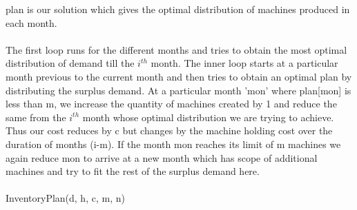 \documentclass[10pt]{article}
\begin{document}
plan is our solution which gives the optimal distribution of machines produced in each month.\\\\
The first loop runs for the different months and tries to obtain the most optimal distribution of demand till the $i^{th}$ month. The inner loop starts at a particular month previous to the current month and then tries to obtain an optimal plan by distributing the surplus demand. At a particular month 'mon' where plan[mon] is less than m, we increase the quantity of machines created by 1 and reduce the same from the $i^{th}$ month whose optimal distribution we are trying to achieve. Thus our cost reduces by c but changes by the machine holding cost over the duration of months (i-m). If the month mon reaches its limit of m machines we again reduce mon to arrive at a new month which has scope of additional machines and try to fit the rest of the surplus demand here.\\\\
InventoryPlan(d, h, c, m, n)
\end{document}
